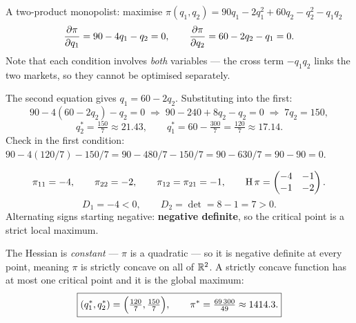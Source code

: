 \begin{worked}{A two-product monopolist: maximise $\pi(q_{1},q_{2})=90q_{1}-2q_{1}^{2}+60q_{2}-q_{2}^{2}-q_{1}q_{2}$}
\[
  \frac{\partial \pi}{\partial q_{1}}=90-4q_{1}-q_{2}=0,
  \qquad
  \frac{\partial \pi}{\partial q_{2}}=60-2q_{2}-q_{1}=0 .
\]
Note that each condition involves \emph{both} variables --- the cross term
$-q_{1}q_{2}$ links the two markets, so they cannot be optimised separately.

The second equation gives $q_{1}=60-2q_{2}$. Substituting into the first:
\[
  90-4(60-2q_{2})-q_{2}=0
  \;\Longrightarrow\;
  90-240+8q_{2}-q_{2}=0
  \;\Longrightarrow\;
  7q_{2}=150 ,
\]
\[
  q_{2}^{*}=\tfrac{150}{7}\approx21.43,
  \qquad
  q_{1}^{*}=60-\tfrac{300}{7}=\tfrac{120}{7}\approx17.14 .
\]
Check in the first condition: $90-4(120/7)-150/7=90-480/7-150/7
=90-630/7=90-90=0$. \checkmark

\[
  \pi_{11}=-4,\qquad \pi_{22}=-2,\qquad \pi_{12}=\pi_{21}=-1,
  \qquad
  \operatorname{H}\pi=\begin{pmatrix}-4&-1\\-1&-2\end{pmatrix}.
\]
\[
  D_{1}=-4<0,
  \qquad
  D_{2}=\det=8-1=7>0 .
\]
Alternating signs starting negative: \textbf{negative definite}, so the
critical point is a strict local maximum.

The Hessian is \emph{constant} --- $\pi$ is a quadratic --- so it is
negative definite at every point, meaning $\pi$ is strictly concave on all
of $\mathbb{R}^{2}$. A strictly concave function has at most one critical point and
it is the global maximum:
\[
  \boxed{(q_{1}^{*},q_{2}^{*})=\Bigl(\tfrac{120}{7},\tfrac{150}{7}\Bigr),
         \qquad \pi^{*}=\tfrac{69\,300}{49}\approx1414.3 .}
\]


\end{worked}
